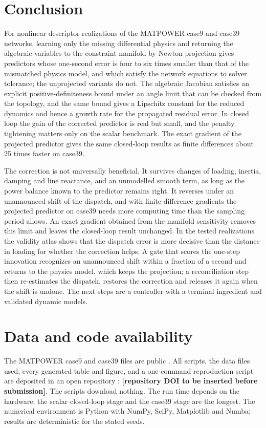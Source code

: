 \documentclass[preprint,12pt]{elsarticle}
\newcommand{\repodoi}{[repository DOI to be inserted before submission]}
\begin{document}
\section{Conclusion}
For nonlinear descriptor realizations of the MATPOWER case9 and case39 networks, learning only the missing differential physics and returning the algebraic variables to the constraint manifold by Newton projection gives predictors whose one-second error is four to six times smaller than that of the mismatched physics model, and which satisfy the network equations to solver tolerance; the unprojected variants do not. The algebraic Jacobian satisfies an explicit positive-definiteness bound under an angle limit that can be checked from the topology, and the same bound gives a Lipschitz constant for the reduced dynamics and hence a growth rate for the propagated residual error. In closed loop the gain of the corrected predictor is real but small, and the penalty tightening matters only on the scalar benchmark. The exact gradient of the projected predictor gives the same closed-loop results as finite differences about 25 times faster on case39.

The correction is not universally beneficial. It survives changes of loading, inertia, damping and line reactance, and an unmodelled smooth term, as long as the power balance known to the predictor remains right. It reverses under an unannounced shift of the dispatch, and with finite-difference gradients the projected predictor on case39 needs more computing time than the sampling period allows. An exact gradient obtained from the manifold sensitivity removes this limit and leaves the closed-loop result unchanged. In the tested realizations the validity atlas shows that the dispatch error is more decisive than the distance in loading for whether the correction helps. A gate that scores the one-step innovation recognizes an unannounced shift within a fraction of a second and returns to the physics model, which keeps the projection; a reconciliation step then re-estimates the dispatch, restores the correction and releases it again when the shift is undone. The next steps are a controller with a terminal ingredient and validated dynamic models.

\section*{Data and code availability}
\label{sec:data}
The MATPOWER case9 and case39 files are public \cite{matpowerdata}. All scripts, the data files used, every generated table and figure, and a one-command reproduction script are deposited in an open repository \cite{repo}: \textbf{\repodoi}. The scripts download nothing. The run time depends on the hardware; the scalar closed-loop stage and the case39 stage are the longest. The numerical environment is Python with NumPy, SciPy, Matplotlib and Numba; results are deterministic for the stated seeds.
\end{document}
